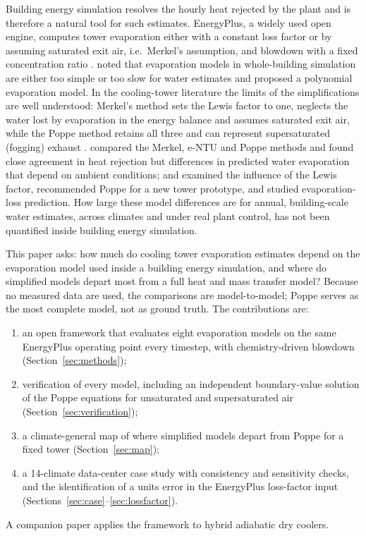 \documentclass[preprint,12pt,authoryear]{elsarticle}
\begin{document}
Building energy simulation resolves the hourly heat rejected by the plant and is therefore a natural tool for such
estimates. EnergyPlus, a widely used open engine, computes tower evaporation either with a constant loss factor or by
assuming saturated exit air, i.e.\ Merkel's assumption, and blowdown with a fixed concentration ratio
\citep{doe2022engref}. \citet{powers2016new} noted that evaporation models in whole-building simulation are either too
simple or too slow for water estimates and proposed a polynomial evaporation model. In the cooling-tower literature the
limits of the simplifications are well understood: Merkel's method \citep{merkel1925verdunstungskuhlung} sets the Lewis
factor to one, neglects the water lost by evaporation in the energy balance and assumes saturated exit air, while the
Poppe method \citep{poppe1991berechnung} retains all three and can represent supersaturated (fogging) exhaust
\citep{klimanek2009solution}. \citet{kloppers2005critical,kloppers2005cooling} compared the Merkel, e-NTU and Poppe
methods and found close agreement in heat rejection but differences in predicted water evaporation that depend on
ambient conditions; \citet{kloppers2005lewis} and \citet{khan2001improved} examined the influence of the Lewis factor,
\citet{navarro2022critical} recommended Poppe for a new tower prototype, and \citet{qureshi2006prediction} studied
evaporation-loss prediction. How large these model differences are for annual, building-scale water estimates, across
climates and under real plant control, has not been quantified inside building energy simulation.

This paper asks: how much do cooling tower evaporation estimates depend on the evaporation model used inside a building
energy simulation, and where do simplified models depart most from a full heat and mass transfer model? Because no
measured data are used, the comparisons are model-to-model; Poppe serves as the most complete model, not as ground
truth. The contributions are:
\begin{enumerate}
\item an open framework that evaluates eight evaporation models on the same EnergyPlus operating point every timestep,
with chemistry-driven blowdown (Section~\ref{sec:methods});
\item verification of every model, including an independent boundary-value solution of the Poppe equations for
unsaturated and supersaturated air (Section~\ref{sec:verification});
\item a climate-general map of where simplified models depart from Poppe for a fixed tower (Section~\ref{sec:map});
\item a 14-climate data-center case study with consistency and sensitivity checks, and the identification of a units
error in the EnergyPlus loss-factor input (Sections~\ref{sec:case}--\ref{sec:lossfactor}).
\end{enumerate}
A companion paper applies the framework to hybrid adiabatic dry coolers.
\end{document}
